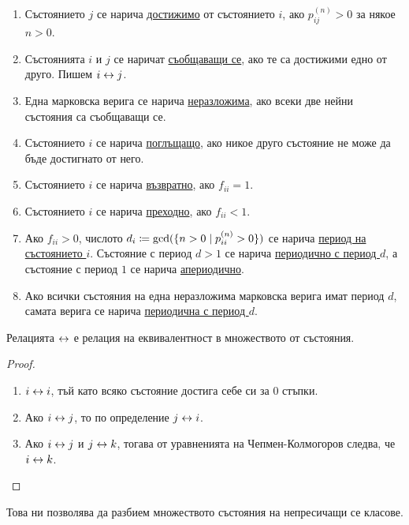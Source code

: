 \documentclass[numbers=endperiod, DIV=15, bibliography=totocnumbered]{scrartcl}
\begin{document}
\begin{definition}
  \mbox{}
  \begin{enumerate}
    \item Състоянието $j$ се нарича \uline{достижимо} от състоянието $i$, ако $p^{(n)}_{ij} > 0$ за някое $n > 0$.
    \item Състоянията $i$ и $j$ се наричат \uline{съобщаващи се}, ако те са достижими едно от друго. Пишем $i \leftrightarrow j$.
    \item Една марковска верига се нарича \uline{неразложима}, ако всеки две нейни състояния са съобщаващи се.
    \item Състоянието $i$ се нарича \uline{поглъщащо}, ако никое друго състояние не може да бъде достигнато от него.
    \item Състоянието $i$ се нарича \uline{възвратно}, ако $f_{ii} = 1$.
    \item Състоянието $i$ се нарича \uline{преходно}, ако $f_{ii} < 1$.
    \item Ако $f_{ii} > 0$, числото $d_i \coloneqq \operatorname{gcd} (\{ n > 0 \mid p_{ii}^{(n)} > 0 \})$ се нарича \uline{период на състоянието $i$}. Състояние с период $d > 1$ се нарича \uline{периодично с период $d$}, а състояние с период $1$ се нарича \uline{апериодично}.
    \item Ако всички състояния на една неразложима марковска верига имат период $d$, самата верига се нарича \uline{периодична с период $d$}.
  \end{enumerate}
\end{definition}

\begin{proposition}
  Релацията $\leftrightarrow$ е релация на еквивалентност в множеството от състояния.
\end{proposition}
\begin{proof}
  \mbox{}
  \begin{enumerate}
    \item $i \leftrightarrow i$, тъй като всяко състояние достига себе си за $0$ стъпки.
    \item Ако $i \leftrightarrow j$, то по определение $j \leftrightarrow i$.
    \item Ако $i \leftrightarrow j$ и $j \leftrightarrow k$, тогава от уравненията на Чепмен-Колмогоров следва, че $i \leftrightarrow k$.
  \end{enumerate}
\end{proof}

Това ни позволява да разбием множеството състояния на непресичащи се класове.
\end{document}
